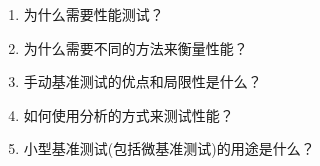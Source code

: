 \begin{enumerate}
\item 为什么需要性能测试？
\item 为什么需要不同的方法来衡量性能？
\item 手动基准测试的优点和局限性是什么？
\item 如何使用分析的方式来测试性能？
\item 小型基准测试(包括微基准测试)的用途是什么？
\end{enumerate}